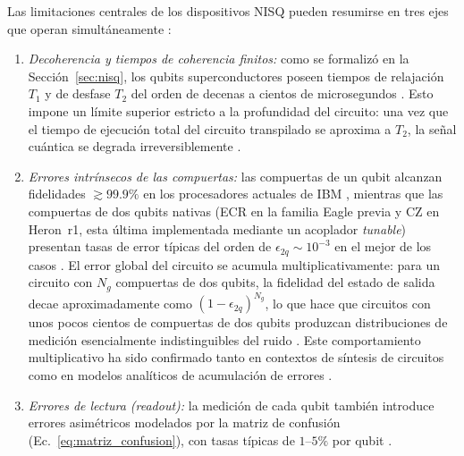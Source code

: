 \documentclass[12pt, spanish]{book}
\begin{document}
Las limitaciones centrales de los dispositivos NISQ pueden resumirse en tres ejes que operan simultáneamente \cite{Preskill, Lammers2025}:

\begin{enumerate}
    \item \textit{Decoherencia y tiempos de coherencia finitos:} como se formalizó en la Sección~\ref{sec:nisq}, los qubits superconductores poseen tiempos de relajación $T_1$ y de desfase $T_2$ del orden de decenas a cientos de microsegundos \cite{AbuGhanem2025, errores_lectura, Preskill}. Esto impone un límite superior estricto a la profundidad del circuito: una vez que el tiempo de ejecución total del circuito transpilado se aproxima a $T_2$, la señal cuántica se degrada irreversiblemente \cite{Preskill}.

    \item \textit{Errores intrínsecos de las compuertas:} las compuertas de un qubit alcanzan fidelidades $\gtrsim 99.9\%$ en los procesadores actuales de IBM \cite{compuertas_CNOT,AbuGhanem2025}, mientras que las compuertas de dos qubits nativas (ECR en la familia Eagle previa y CZ en Heron~r1, esta última implementada mediante un acoplador \textit{tunable})\cite{IBM_ECRGate2025} presentan tasas de error típicas del orden de $\epsilon_{2q} \sim 10^{-3}$ en el mejor de los casos \cite{AbuGhanem2025, DeCusatis2021,errores_lectura}. El error global del circuito se acumula multiplicativamente: para un circuito con $N_g$ compuertas de dos qubits, la fidelidad del estado de salida decae aproximadamente como $(1 - \epsilon_{2q})^{N_g}$, lo que hace que circuitos con unos pocos cientos de compuertas de dos qubits produzcan distribuciones de medición esencialmente indistinguibles del ruido \cite{szasz2023numerical}. Este comportamiento multiplicativo ha sido confirmado tanto en contextos de síntesis de circuitos \cite{szasz2023numerical}
          como en modelos analíticos de acumulación de errores \cite{deburuaga2024fidelity}.

    \item \textit{Errores de lectura (\textit{readout}):} la medición de cada qubit también introduce errores asimétricos modelados por la matriz de confusión (Ec.~\ref{eq:matriz_confusion}), con tasas típicas de $1$--$5\%$ por qubit \cite{DeCusatis2021}.
\end{enumerate}

\end{document}
